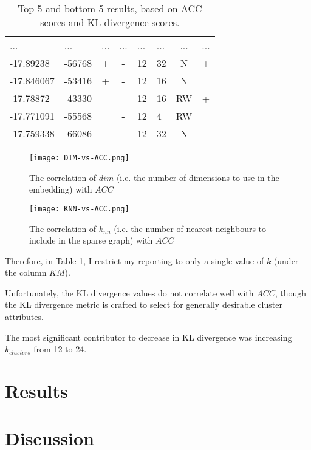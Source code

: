 \documentclass{article}
\begin{document}
\begin{table}[ht]
\begin{tabular}{|l|l|c|c|l|l|c|c}
    ... & ... & ... & ... & ... & ... & ... & ...\\
    -17.89238 & -56768 & + & - & 12 & 32 & N & +\\
    -17.846067 & -53416 & + & - & 12 & 16 & N & \\
    -17.78872 & -43330 &  & - & 12 & 16 & RW & +\\
    -17.771091 & -55568 &  & - & 12 & 4 & RW & \\
    -17.759338 & -66086 &  & - & 12 & 32 & N & \\
    \end{tabular}
    \caption{Top 5 and bottom 5 results, based on ACC scores and KL divergence scores. \label{tab:ress}}
\end{table}

\begin{figure}
    \centering
    \texttt{[image: DIM-vs-ACC.png]}
    \caption{The correlation of $dim$ (i.e. the number of dimensions to use in the embedding) with $ACC$}
    \label{fig:acc_v_dim}
\end{figure}
\begin{figure}
    \centering
    \texttt{[image: KNN-vs-ACC.png]}
    \caption{The correlation of $k_{nn}$ (i.e. the number of nearest neighbours to include in the sparse graph) with $ACC$}
    \label{fig:acc_v_knn}
\end{figure}


Therefore, in Table \ref{tab:ress}, I restrict my reporting to only a single value of $k$ (under the column $KM$).



Unfortunately, the KL divergence values do not correlate well with $ACC$, though the KL divergence metric is crafted to select for generally desirable cluster attributes.

The most significant contributor to decrease in KL divergence was increasing $k_{clusters}$ from 12 to 24.

\section{Results}

\section{Discussion}
\end{document}

